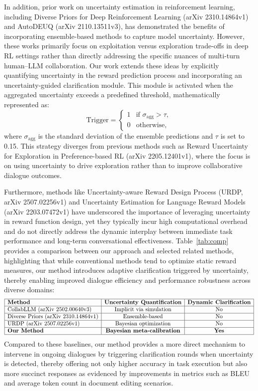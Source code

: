 \documentclass{article}
\begin{document}
In addition, prior work on uncertainty estimation in reinforcement learning, including Diverse Priors for Deep Reinforcement Learning (arXiv 2310.14864v1) and AutoDEUQ (arXiv 2110.13511v3), has demonstrated the benefits of incorporating ensemble-based methods to capture model uncertainty. However, these works primarily focus on exploitation versus exploration trade-offs in deep RL settings rather than directly addressing the specific nuances of multi-turn human–LLM collaboration. Our work extends these ideas by explicitly quantifying uncertainty in the reward prediction process and incorporating an uncertainty-guided clarification module. This module is activated when the aggregated uncertainty exceeds a predefined threshold, mathematically represented as:
\[
\text{Trigger} = \begin{cases} 
1 & \text{if } \sigma_{\text{agg}} > \tau, \\
0 & \text{otherwise,}
\end{cases}
\]
where \(\sigma_{\text{agg}}\) is the standard deviation of the ensemble predictions and \(\tau\) is set to 0.15. This strategy diverges from previous methods such as Reward Uncertainty for Exploration in Preference-based RL (arXiv 2205.12401v1), where the focus is on using uncertainty to drive exploration rather than to improve collaborative dialogue outcomes.

Furthermore, methods like Uncertainty-aware Reward Design Process (URDP, arXiv 2507.02256v1) and Uncertainty Estimation for Language Reward Models (arXiv 2203.07472v1) have underscored the importance of leveraging uncertainty in reward function design, yet they typically incur high computational overhead and do not directly address the dynamic interplay between immediate task performance and long-term conversational effectiveness. Table~\ref{tab:comp} provides a comparison between our approach and selected related methods, highlighting that while conventional methods tend to optimize static reward measures, our method introduces adaptive clarification triggered by uncertainty, thereby enabling improved dialogue efficiency and performance robustness across diverse domains:
\[
\begin{array}{|l|c|c|}
\hline
\textbf{Method} & \textbf{Uncertainty Quantification} & \textbf{Dynamic Clarification} \\
\hline
\text{CollabLLM (arXiv 2502.00640v3)} & \text{Implicit via simulation} & \text{No} \\
\hline
\text{Diverse Priors (arXiv 2310.14864v1)} & \text{Ensemble-based} & \text{No} \\
\hline
\text{URDP (arXiv 2507.02256v1)} & \text{Bayesian optimization} & \text{No} \\
\hline
\textbf{Our Method} & \textbf{Bayesian meta-calibration} & \textbf{Yes} \\
\hline
\end{array}
\]
Compared to these baselines, our method provides a more direct mechanism to intervene in ongoing dialogues by triggering clarification rounds when uncertainty is detected, thereby offering not only higher accuracy in task execution but also more succinct responses as evidenced by improvements in metrics such as BLEU and average token count in document editing scenarios.
\end{document}
